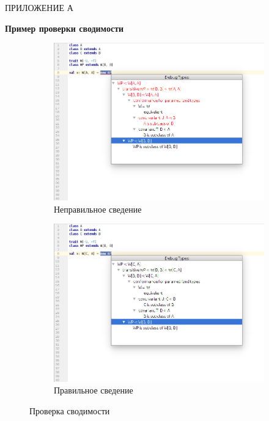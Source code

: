 \vfill
\clearpage
\appendix

\hfill ПРИЛОЖЕНИЕ А
\begin{center}
  \textbf{Пример проверки сводимости}
\end{center}
\markboth{\MakeUppercase{}}{}

\begin{figure}[h!]
  \centering
  \begin{subfigure}{\linewidth}
    \centering
    \includegraphics[width=.8\linewidth]{img/conformance1}
    \caption{Неправильное сведение}
  \end{subfigure}

  \begin{subfigure}{\linewidth}
    \centering
    \includegraphics[width=.8\linewidth]{img/conformance2}
    \caption{Правильное сведение}
  \end{subfigure}
  \caption{Проверка сводимости}
  \label{fig:conformance}
\end{figure}


